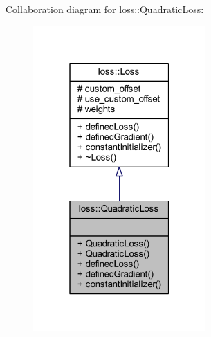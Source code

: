 Collaboration diagram for loss\+:\+:Quadratic\+Loss\+:\nopagebreak
\begin{figure}[H]
\begin{center}
\leavevmode
\includegraphics[width=187pt]{classloss_1_1_quadratic_loss__coll__graph}
\end{center}
\end{figure}
